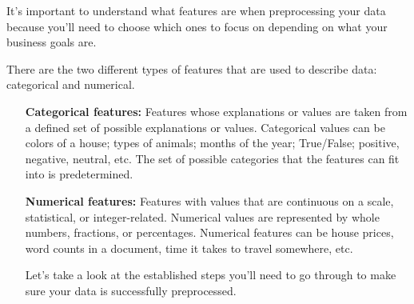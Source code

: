 \documentclass[12pt]{article}  %
\begin{document}
 It’s important to understand what features are when preprocessing your data because you’ll need to choose which ones to focus on depending on what your business goals are. 
 
 There are the two different types of features that are used to describe data: categorical and numerical.
 
 \begin{itemize}
     \setlength{\parsep}{0ex} %
     \setlength{\topsep}{2ex} %
     \setlength{\itemsep}{1ex} %
 \item [\textbf{Categorical features:}] Features whose explanations or values are taken from a defined set of possible explanations or values. Categorical values can be colors of a house; types of animals; months of the year; True/False; positive, negative, neutral, etc. The set of possible categories that the features can fit into is predetermined.
 \item [\textbf{Numerical features: }]
 Features with values that are continuous on a scale, statistical, or integer-related. Numerical values are represented by whole numbers, fractions, or percentages. Numerical features can be house prices, word counts in a document, time it takes to travel somewhere, etc.
 
 Let’s take a look at the established steps you’ll need to go through to make sure your data is successfully preprocessed.
 

\end{itemize}
\end{document}
